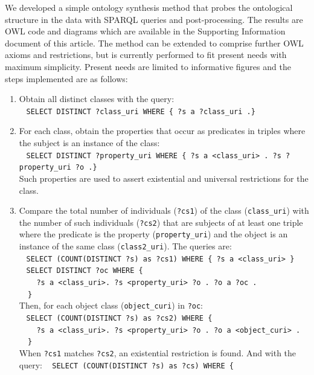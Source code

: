 \documentclass[review]{elsarticle}
\newcommand{\textttt}[1] {\texttt{\footnotesize#1}}
\newcommand{\h} {\hphantom ~ }
\begin{document}
We developed a simple ontology synthesis method that probes
the ontological structure in the data with
SPARQL queries and post-processing.
The results are OWL code and diagrams which are available in the
Supporting Information document of this article.
The method can be extended to comprise further OWL axioms and restrictions,
but is currently performed to fit present needs with maximum simplicity.
Present needs are limited to informative figures and
the steps implemented are as follows:
\begin{enumerate}[leftmargin=0cm]
    \item Obtain all distinct classes with the query:\\
        \h\textttt{SELECT DISTINCT ?class\_uri WHERE \{ ?s a ?class\_uri .\}}
\item For each class, obtain the properties that occur as predicates in triples where the subject is an instance of the class:\\
	\h\textttt{SELECT DISTINCT ?property\_uri WHERE \{ ?s a <class\_uri> . ?s ?property\_uri ?o .\}}\\
Such properties are used to assert existential and universal restrictions for the class.
\item Compare the total number of individuals (\textttt{?cs1}) of the class (\textttt{class\_uri}) with
	the number of such individuals (\textttt{?cs2}) that are subjects of at least one triple where 
        the predicate is the property (\textttt{property\_uri}) and the object is
        an instance of the same class (\textttt{class2\_uri}).
	The queries are:\\
	\h\textttt{SELECT (COUNT(DISTINCT ?s) as ?cs1) WHERE \{ ?s a <class\_uri> \}}\\
        \h\textttt{SELECT DISTINCT ?oc WHERE \{\\
	\h\h ?s a <class\_uri>. ?s <property\_uri> ?o . ?o a ?oc . \\ 
        \h\}}\\
        Then, for each object class (\textttt{object\_curi}) in \textttt{?oc}:\\
	\h\textttt{SELECT (COUNT(DISTINCT ?s) as ?cs2) WHERE \{\\
	\h\h ?s a <class\_uri>. ?s <property\_uri> ?o . ?o a <object\_curi> .\\         \h\}}\\
        When \textttt{?cs1} matches \textttt{?cs2}, an existential restriction is found. And with the query:
	\h\textttt{SELECT (COUNT(DISTINCT ?s) as ?cs) WHERE \{\\
}
\end{enumerate}
\end{document}
